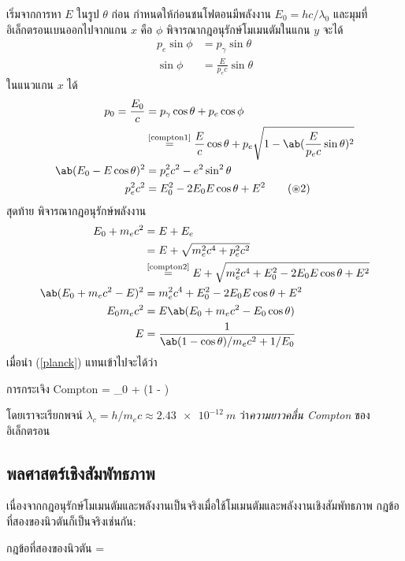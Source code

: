 \begin{soln}
    เริ่มจากการหา $E$ ในรูป $\theta$ ก่อน กำหนดให้ก่อนชนโฟตอนมีพลังงาน $E_0 = hc/\lambda_0$ และมุมที่อิเล็กตรอนเบนออกไปจากแกน $x$ คือ $\phi$ พิจารณากฎอนุรักษ์โมเมนตัมในแกน $y$ จะได้
    \begin{align*}
        p_e\sin\phi &= p_\gamma\sin\theta \\
        \sin\phi &= \frac{E}{p_ec}\sin\theta\tag{$\circledast$1}\label{compton1}
    \end{align*}
    ในแนวแกน $x$ ได้
    \begin{align*}
        p_0 = \frac{E_0}{c} &= p_\gamma\cos\theta + p_e\cos\phi \\
        &\overset{\text{\ref{compton1}}}{=} \frac{E}{c}\cos\theta + p_e\sqrt{1 - \ab(\frac{E}{p_ec}\sin\theta)^2}\\
        \ab(E_0 - E\cos\theta)^2 &= p_e^2c^2 - e^2\sin^2\theta\\
        p_e^2c^2 &= E_0^2 -2E_0E\cos\theta + E^2\tag{$\circledast$2}\label{compton2}
    \end{align*}
    สุดท้าย พิจารณากฎอนุรักษ์พลังงาน
    \begin{align}
        E_0 + m_ec^2 &= E + E_e\notag\\
        &= E + \sqrt{m_e^2c^4 + p_e^2c^2}\notag\\
        &\overset{\text{\ref{compton2}}}{=} E + \sqrt{m_e^2c^4 + E_0^2 - 2E_0E\cos\theta + E^2}\notag\\
        \ab(E_0 + m_ec^2 - E)^2 &= m_e^2c^4 + E_0^2 - 2E_0E\cos\theta + E^2\notag\\
        E_0m_ec^2 &= E\ab(E_0 + m_ec^2 - E_0\cos\theta)\notag\\
        E &= \frac{1}{\ab(1 - \cos\theta)/m_ec^2 + 1/E_0}
    \end{align}
    เมื่อนำ (\ref{planck}) แทนเข้าไปจะได้ว่า
    \begin{eqbox}{การกระเจิง Compton}
        \lambda = \lambda_0 + \ab(1 - \cos\theta)
    \end{eqbox}
    โดยเราจะเรียกพจน์ $\lambda_c = h/m_ec \approx \qty{2.43e-12}{m}$ ว่า\emph{ความยาวคลื่น Compton} ของอิเล็กตรอน
\end{soln}

\subsection{พลศาสตร์เชิงสัมพัทธภาพ}

เนื่องจากกฎอนุรักษ์โมเมนตัมและพลังงานเป็นจริงเมื่อใช้โมเมนตัมและพลังงานเชิงสัมพัทธภาพ กฎข้อที่สองของนิวตันก็เป็นจริงเช่นกัน:
\begin{ieqbox}{กฎข้อที่สองของนิวตัน}
     = 
\end{ieqbox}